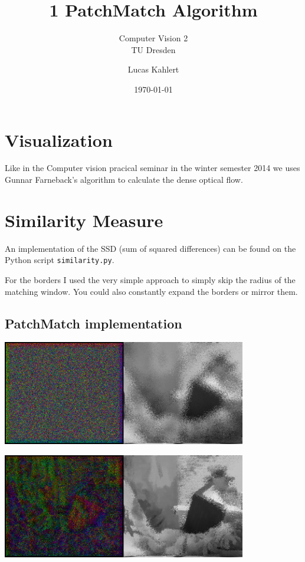\documentclass[a4paper]{scrartcl}
\title{1 PatchMatch Algorithm}
\subtitle{Computer Vision 2 \\ TU Dresden}
\author{Lucas Kahlert}
\date{\today}
\begin{document}
\maketitle


\section{Visualization}

Like in the Computer vision pracical seminar in the winter semester 2014 we uses
Gunnar Farneback's algorithm to calculate the dense optical flow.


\section{Similarity Measure}

An implementation of the SSD (sum of squared differences) can be found on the Python
script \texttt{similarity.py}.

For the borders I used the very simple approach to simply skip the radius of the
matching window. You could also constantly expand the borders or mirror them.


\subsection{PatchMatch implementation}


\vspace{1cm}
\begin{minipage}{0.8\textwidth}
  \centering
  \includegraphics[width=0.8\textwidth]{images/flow-py-1-it-0.png}
\end{minipage}

\vspace{1cm}
\begin{minipage}{0.8\textwidth}
  \centering
  \includegraphics[width=0.8\textwidth]{images/flow-py-1-it-1.png}
\end{minipage}
\end{document}
